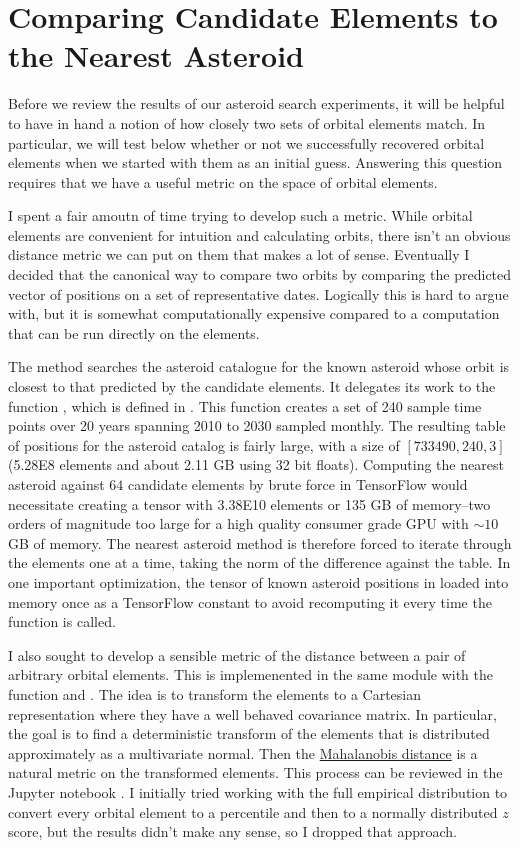 \section{Comparing Candidate Elements to the Nearest Asteroid}
Before we review the results of our asteroid search experiments, it will be helpful to have in hand a notion of how closely two sets of orbital elements match.
In particular, we will test below whether or not we successfully recovered orbital elements when we started with them as an initial guess.
Answering this question requires that we have a useful metric on the space of orbital elements.

I spent a fair amoutn of time trying to develop such a metric.
While orbital elements are convenient for intuition and calculating orbits, there isn't an obvious distance metric we can put on them that makes a lot of sense.
Eventually I decided that the canonical way to compare two orbits by comparing the predicted vector of positions on a set of representative dates.
Logically this is hard to argue with, but it is somewhat computationally expensive compared to a computation that can be run directly on the elements.

The method  searches the asteroid catalogue for the known asteroid whose orbit is closest to that predicted by the candidate elements.
It delegates its work to the function , which is defined in .
This function creates a set of 240 sample time points over 20 years spanning 2010 to 2030 sampled monthly.
The resulting table of positions for the asteroid catalog is fairly large, with a size of $[733490, 240, 3]$ (5.28E8 elements and about 2.11 GB using 32 bit floats).
Computing the nearest asteroid against $64$ candidate elements by brute force in TensorFlow would necessitate creating a tensor with 3.38E10 elements
or 135 GB of memory--two orders of magnitude too large for a high quality consumer grade GPU with $\sim 10$ GB of memory.
The nearest asteroid method is therefore forced to iterate through the elements one at a time, taking the norm of the difference against the table.
In one important optimization, the tensor of known asteroid positions in loaded into memory 
once as a TensorFlow constant to avoid recomputing it every time the function is called.

I also sought to develop a sensible metric of the distance between a pair of arbitrary orbital elements.
This is implemenented in the same module with the function  and .
The idea is to transform the elements to a Cartesian representation where they have a well behaved covariance matrix.
In particular, the goal is to find a deterministic transform of the elements that is distributed approximately as a multivariate normal.
Then the \href{https://en.wikipedia.org/wiki/Mahalanobis_distance}{Mahalanobis distance} is a natural metric on the transformed elements.
This process can be reviewed in the Jupyter notebook .
I initially tried working with the full empirical distribution to convert every orbital element to a percentile and then to a normally distributed $z$ score,
but the results didn't make any sense, so I dropped that approach.

